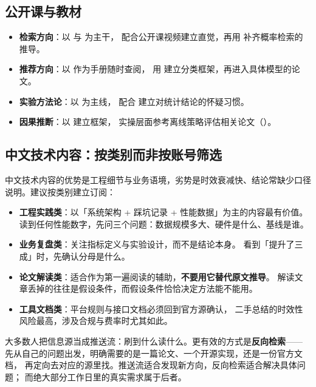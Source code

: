 \subsection{公开课与教材}

\begin{itemize}
  \item \textbf{检索方向}：以 \cite{manning2008ir} 与 \cite{croft2010search} 为主干，
        配合公开课视频建立直觉，再用 \cite{robertson2009bm25} 补齐概率检索的推导。
  \item \textbf{推荐方向}：以 \cite{ricci2015recsys} 作为手册随时查阅，
        用 \cite{adomavicius2005survey} 建立分类框架，再进入具体模型的论文。
  \item \textbf{实验方法论}：以 \cite{kohavi2020trustworthy} 为主线，
        配合 \cite{ioannidis2005why} 建立对统计结论的怀疑习惯。
  \item \textbf{因果推断}：以 \cite{pearl2009causality} 建立框架，
        实操层面参考离线策略评估相关论文（\cite{dudik2011ee,swaminathan2015counterfactual}）。
\end{itemize}

\subsection{中文技术内容：按类别而非按账号筛选}

中文技术内容的优势是工程细节与业务语境，劣势是时效衰减快、结论常缺少口径说明。建议按类别建立订阅：

\begin{itemize}
  \item \textbf{工程实践类}：以「系统架构 + 踩坑记录 + 性能数据」为主的内容最有价值。
        读到任何性能数字，先问三个问题：数据规模多大、硬件是什么、基线是谁。
  \item \textbf{业务复盘类}：关注指标定义与实验设计，而不是结论本身。
        看到「提升了三成」时，先确认分母是什么。
  \item \textbf{论文解读类}：适合作为第一遍阅读的辅助，\textbf{不要用它替代原文推导}。
        解读文章丢掉的往往是假设条件，而假设条件恰恰决定方法能不能用。
  \item \textbf{工具文档类}：平台规则与接口文档必须回到官方源确认，
        二手总结的时效性风险最高，涉及合规与费率时尤其如此。
\end{itemize}

\begin{insight}
大多数人把信息源当成推送流：刷到什么读什么。更有效的方式是\textbf{反向检索}——
先从自己的问题出发，明确需要的是一篇论文、一个开源实现，还是一份官方文档，
再定向去对应的源里找。推送流适合发现新方向，反向检索适合解决具体问题；
而绝大部分工作日里的真实需求属于后者。
\end{insight}

